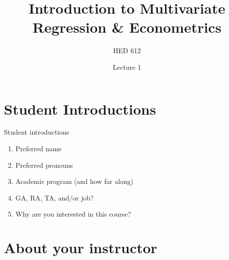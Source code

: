\documentclass[
  8pt,
  ignorenonframetext,
  dvipsnames]{beamer}
\title{Introduction to Multivariate Regression \& Econometrics}
\subtitle{HED 612}
\author{Lecture 1}
\date{}
\providecommand{\tightlist}{%
  \setlength{\itemsep}{0pt}\setlength{\parskip}{0pt}}
\let\olditem\item
\renewcommand{\item}{%
  \olditem\vspace{4pt}
}
\begin{document}
\frame{\titlepage}

\begin{frame}
  \tableofcontents[hideallsubsections]
\end{frame}
\hypertarget{student-introductions}{%
\section{Student Introductions}\label{student-introductions}}

\begin{frame}{Student introductions}
\protect\hypertarget{student-introductions-1}{}

\begin{enumerate}
\tightlist
\item
  Preferred name
\item
  Preferred pronouns
\item
  Academic program (and how far along)
\item
  GA, RA, TA, and/or job?
\item
  Why are you interested in this course?
\end{enumerate}

\end{frame}

\hypertarget{about-your-instructor}{%
\section{About your instructor}\label{about-your-instructor}}
\end{document}
